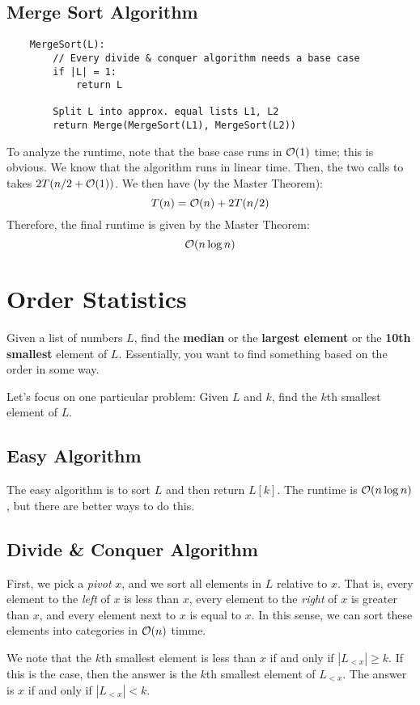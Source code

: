 \documentclass[letterpaper]{article}
\begin{document}
\subsection{Merge Sort Algorithm}
\begin{verbatim}
    MergeSort(L):
        // Every divide & conquer algorithm needs a base case 
        if |L| = 1:
            return L
        
        Split L into approx. equal lists L1, L2
        return Merge(MergeSort(L1), MergeSort(L2))
\end{verbatim}

To analyze the runtime, note that the base case runs in $\mathcal{O}(1)$ time; this is obvious. We know that the  algorithm runs in linear time. Then, the two calls to  takes $2T(n / 2 + \mathcal{O}(1))$. We then have (by the Master Theorem):
\[T(n) = \mathcal{O}(n) + 2T(n / 2)\]
Therefore, the final runtime is given by the Master Theorem:
\[\mathcal{O}(n\log n)\]

\section{Order Statistics}
Given a list of numbers $L$, find the \textbf{median} or the \textbf{largest element} or the \textbf{10th smallest} element of $L$. Essentially, you want to find something based on the order in some way. 

\bigskip 

Let's focus on one particular problem: Given $L$ and $k$, find the $k$th smallest element of $L$. 

\subsection{Easy Algorithm}
The easy algorithm is to sort $L$ and then return $L[k]$. The runtime is $\mathcal{O}(n \log n)$, but there are better ways to do this. 

\subsection{Divide \& Conquer Algorithm}
First, we pick a \emph{pivot} $x$, and we sort all elements in $L$ relative to $x$. That is, every element to the \emph{left} of $x$ is less than $x$, every element to the \emph{right} of $x$ is greater than $x$, and every element next to $x$ is equal to $x$. In this sense, we can sort these elements into categories in $\mathcal{O}(n)$ timme. 

\bigskip 

We note that the $k$th smallest element is less than $x$ if and only if $|L_{< x}| \geq k$. If this is the case, then the answer is the $k$th smallest element of $L_{< x}$. The answer is $x$ if and only if $|L_{< x}| < k$. %
\end{document}
